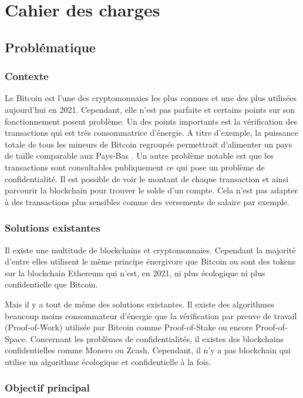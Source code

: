 \documentclass[../tb_report.tex]{subfiles}
\begin{document}
\chapter{Cahier des charges}

\section*{Problématique}

\subsection*{Contexte}

Le Bitcoin est l'une des cryptomonnaies les plus connues et une des plus utilisées aujourd'hui en 2021. Cependant, elle n'est pas parfaite et certains points sur son fonctionnement posent problème. Un des points importants est la vérification des transactions qui est très consommatrice d'énergie. A titre d'exemple, la puissance totale de tous les mineurs de Bitcoin regroupés permettrait d'alimenter un pays de taille comparable aux Pays-Bas \cite{BTC_cons}. Un autre problème notable est que les transactions sont consultables publiquement ce qui pose un problème de confidentialité. Il est possible de voir le montant de chaque transaction et ainsi parcourir la blockchain pour trouver le solde d'un compte. Cela n'est pas adapter à des transactions plus sensibles comme des versements de salaire par exemple.

\subsection*{Solutions existantes}

Il existe une multitude de blockchains et cryptomonnaies. Cependant la majorité d'entre elles utilisent le même principe énergivore que Bitcoin ou sont des tokens sur la blockchain Ethereum qui n'est, en 2021, ni plus écologique ni plus confidentielle que Bitcoin.

Mais il y a tout de même des solutions existantes. Il existe des algorithmes beaucoup moins consommateur d'énergie que la vérification par preuve de travail (Proof-of-Work) utilisée par Bitcoin comme Proof-of-Stake ou encore Proof-of-Space. Concernant les problèmes de confidentialités, il existes des blockchains confidentielles comme Monero ou Zcash. Cependant, il n'y a pas blockchain qui utilise un algorithme écologique et confidentielle à la fois.

\subsection*{Objectif principal}
\end{document}
